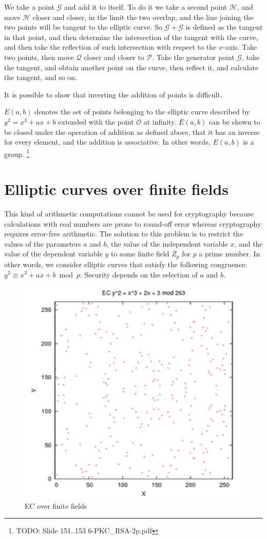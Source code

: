 We take a point $\mathcal{G}$ and add it to itself. To do it we take a second point $\mathcal{H}$, and move $\mathcal{H}$ closer and closer, in the limit the two overlap, and the line joining the two points will be tangent to the elliptic curve. So $\mathcal{G} + \mathcal{G}$ is defined as the tangent in that point, and then determine the intersection of the tangent with the curve, and then take the reflection of such intersection with respect to the $x$-axis.
Take two points, then move $\mathcal{Q}$ closer and closer to $\mathcal{P}$. Take the generator point $\mathcal{G}$, take the tangent, and obtain another point on the curve, then reflect it, and calculate the tangent, and so on.

It is possible to show that inverting the addition of points is difficult.

$E(a,b)$ denotes the set of points belonging to the elliptic curve described by $y^2 = x^3 + ax + b$ extended with the point $\mathcal{O}$ at infinity.
$E(a,b)$ can be shown to be closed under the operation of addition as defined above, that it has an inverse for every element, and the addition is associative. In other words, $E(a,b)$ is a group. \footnote{TODO: Slide 151..153 6-PKC\_RSA-2p.pdf}


\section{Elliptic curves over finite fields}

This kind of arithmetic computations cannot be used for cryptography because calculations with real numbers are prone to round-off error whereas cryptography requires error-free arithmetic.
The solution to this problem is to restrict the values of the parameters $a$ and $b$, the value of the independent variable $x$, and the value of the dependent variable $y$ to some finite field $Z_p$ for $p$ a prime number.
In other words, we consider elliptic curves that satisfy the following congruence: $y^2 \equiv x^3 + ax +b \bmod{p}$. Security depends on the selection of $a$ and $b$.

\begin{figure}
	\centering
	\includegraphics[width=0.3\linewidth]{Images/Chapter5/ecc_finite_fields}
	\caption{EC over finite fields}
	\label{fig:eccfinitefields}
\end{figure}

